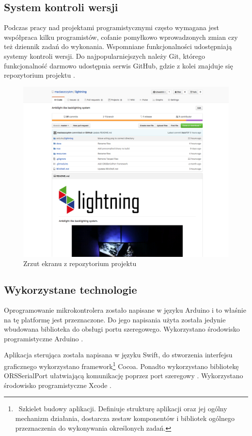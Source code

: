\documentclass[12pt]{report}
\begin{document}
\subsection{System kontroli wersji}

Podczas pracy nad projektami programistycznymi często wymagana jest współpraca kilku programistów, cofanie pomyłkowo wprowadzonych zmian czy też dziennik zadań do wykonania. Wspomniane funkcjonalności udostępniają systemy kontroli wersji. Do najpopularniejszych należy Git, którego funkcjonalność darmowo udostępnia serwis   GitHub, gdzie z kolei znajduje się repozytorium projektu \cite{github}.

\begin{figure}[h]
\centering
\includegraphics[width=\textwidth]{../resources/github.png}
\caption{Zrzut ekranu z repozytorium projektu}
\label{schemat}
\end{figure}

\subsection{Wykorzystane technologie}

Oprogramowanie mikrokontrolera zostało napisane w języku Arduino i to właśnie na tę platformę jest przeznaczone. Do jego napisania użyta została jedynie wbudowana biblioteka do obsługi portu szeregowego. Wykorzystano środowisko programistyczne Arduino \cite{arduinoide}.

Aplikacja sterująca została napisana w języku Swift, do stworzenia interfejsu graficznego wykorzystano framework\footnote{~Szkielet budowy aplikacji. Definiuje strukturę aplikacji oraz jej ogólny mechanizm działania, dostarcza zestaw komponentów i bibliotek ogólnego przeznaczenia do wykonywania określonych zadań.} Cocoa. Ponadto wykorzystano bibliotekę\\ORSSerialPort ułatwiającą komunikację poprzez port szeregowy \cite{orsserialport}. Wykorzystano środowisko programistyczne Xcode \cite{xcode}.
\end{document}

